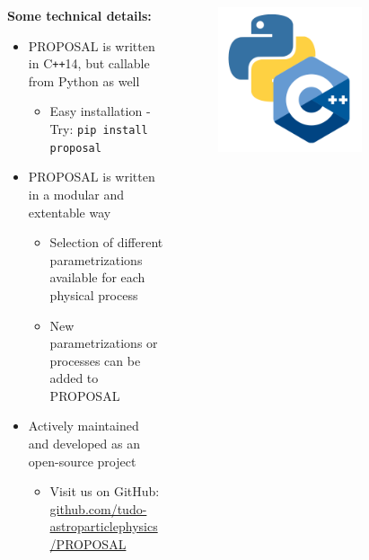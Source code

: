 \begin{frame}[c]
  \begin{columns}[onlytextwidth]
  \begin{column}{0.6\textwidth}
  \textbf{Some technical details:}
  \begin{itemize}
      \setlength{\itemsep}{3pt}
      \item PROPOSAL is written in C\texttt{++}14, but callable from Python as well
          \begin{itemize}
              \item[\rightarrow] Easy installation - Try: \texttt{pip install proposal}
          \end{itemize}
      \item PROPOSAL is written in a modular and extentable way
          \begin{itemize}
              \item[\rightarrow] Selection of different parametrizations available for each physical process
              \item[\rightarrow] New parametrizations or processes can be added to PROPOSAL
          \end{itemize} 
      \item Actively maintained and developed as an open-source project
          \begin{itemize}
              \item[\rightarrow] Visit us on GitHub: \url{github.com/tudo-astroparticlephysics/PROPOSAL}
          \end{itemize}
  \end{itemize}
  \end{column}
  \begin{column}{0.4\textwidth}
    \begin{figure}
        \centering
        \includegraphics[width=0.7\textwidth]{logos/cpp-python.png}
    \end{figure}
  \end{column}
  \end{columns}
\end{frame}
